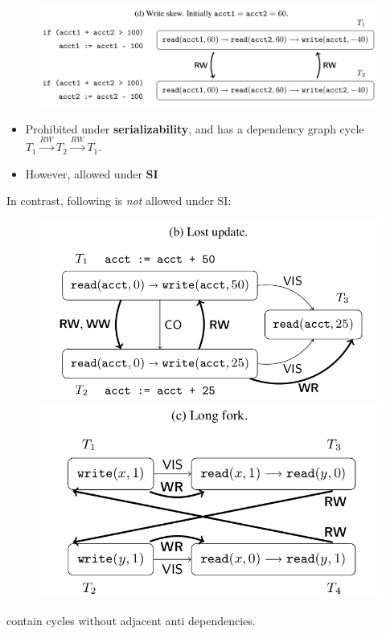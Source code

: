 \documentclass{beamer}
\begin{document}
\begin{frame}
	\begin{figure}
		\includegraphics[scale=0.25]{fig2d}
	\end{figure}
	\begin{itemize}
		\item Prohibited under \textbf{serializability}, and has a dependency graph cycle $ T_1 \xrightarrow{RW} T_2 \xrightarrow{RW} T_1 $.
		\item However, allowed under \textbf{SI}
	\end{itemize}
\end{frame}

\begin{frame}
In contrast, following is \emph{not} allowed under SI:
\begin{figure}
\includegraphics[scale=0.2]{fig2b}
\includegraphics[scale=0.2]{fig2c}
\end{figure}
contain cycles without adjacent anti dependencies.
\end{frame}
\end{document}
